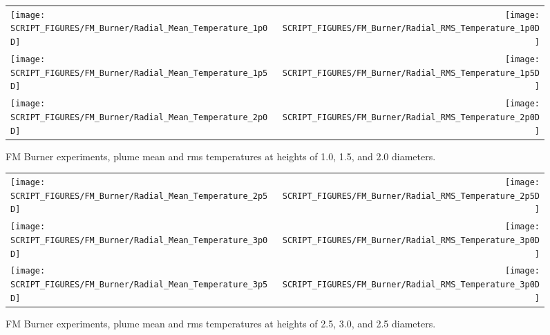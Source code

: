 \begin{figure}[!h]
\begin{tabular*}{\textwidth}{l@{\extracolsep{\fill}}r}
\texttt{[image: SCRIPT\_FIGURES/FM\_Burner/Radial\_Mean\_Temperature\_1p0D]} &
\texttt{[image: SCRIPT\_FIGURES/FM\_Burner/Radial\_RMS\_Temperature\_1p0D]} \\
\texttt{[image: SCRIPT\_FIGURES/FM\_Burner/Radial\_Mean\_Temperature\_1p5D]} &
\texttt{[image: SCRIPT\_FIGURES/FM\_Burner/Radial\_RMS\_Temperature\_1p5D]} \\
\texttt{[image: SCRIPT\_FIGURES/FM\_Burner/Radial\_Mean\_Temperature\_2p0D]} &
\texttt{[image: SCRIPT\_FIGURES/FM\_Burner/Radial\_RMS\_Temperature\_2p0D]}
\end{tabular*}
\caption[FM Burner experiments, plume mean and rms temperatures]
{FM Burner experiments, plume mean and rms temperatures at heights of 1.0, 1.5, and 2.0 diameters.}
\label{FM_Burner_Plume_1}
\end{figure}

\begin{figure}[p]
\begin{tabular*}{\textwidth}{l@{\extracolsep{\fill}}r}
\texttt{[image: SCRIPT\_FIGURES/FM\_Burner/Radial\_Mean\_Temperature\_2p5D]} &
\texttt{[image: SCRIPT\_FIGURES/FM\_Burner/Radial\_RMS\_Temperature\_2p5D]} \\
\texttt{[image: SCRIPT\_FIGURES/FM\_Burner/Radial\_Mean\_Temperature\_3p0D]} &
\texttt{[image: SCRIPT\_FIGURES/FM\_Burner/Radial\_RMS\_Temperature\_3p0D]} \\
\texttt{[image: SCRIPT\_FIGURES/FM\_Burner/Radial\_Mean\_Temperature\_3p5D]} &
\texttt{[image: SCRIPT\_FIGURES/FM\_Burner/Radial\_RMS\_Temperature\_3p0D]}
\end{tabular*}
\caption[FM Burner experiments, plume mean and rms temperatures]
{FM Burner experiments, plume mean and rms temperatures at heights of 2.5, 3.0, and 2.5 diameters.}
\label{FM_Burner_Plume_2}
\end{figure}

